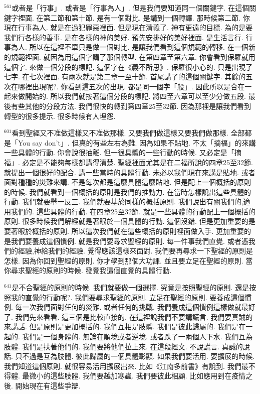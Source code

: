 \documentclass{book}
\begin{document}
$^{561}$或者是「行事」.
或者是「行事為人」.
但是我們要知道同一個關鍵字.
在這個關鍵字裡面.
在第二節和第十節.
是有一個對比.
是講到一個轉譯.
那時候第二節.
你現在行事為人.
就是在過犯罪惡裡面.
但是現在清義了.
神有更遠的目標.
為的是要我們行各樣的善事.
是在各樣的神的美好.
預先安排好的美好裡面.
是生活言行.
行事為人.
所以在這裡不單只是做一個對比.
是讓我們看到這個規範的轉移.
在一個新的規範裡面.
就因為用這個字講了那個轉型.
在第四章至第六章.
你會看到保羅就用這個字.
來做一個分段的標記.
這個字在《義不所思》.
保羅很小心的.
只是出現了七字.
在七次裡面.
有兩次就是第二章一至十節.
首尾講了的這個關鍵字.
其餘的五次在哪裡出現呢?.
你看到這五次的出現.
都是同一個字「般」.
因此所以是合在一起來做開始的.
所以我們就按著這個分段的標記.
將四至六章可以至少分做五段.
最後有些其他的分段方法.
我們很快的轉到第四章25至32節.
因為那裡是讓我們看到轉型的很多提示.
很多時候有人埋怨.

$^{601}$看到聖經又不准做這樣又不准做那樣.
又要我們做這樣又要我們做那樣.
全部都是「You say don't」.
但真的有些左右為難.
因為如果不貼地.
不太「摘福」的來講一些具體的行動.
你會說很抽離.
但一很具體的一些行動的時候.
又必定是「摘福」.
必定是不能夠每樣都講得清楚.
聖經裡面尤其是在二福所說的四章25至32節.
就提出一個很好的配合.
講一些當時的具體行動.
未必以我們現在來講是貼地.
或者面對種種的災難來講.
不是每次都是這麼具體這麼貼地.
但是配上一個概括的原則的時候.
我們就看到一個概括的原則是我們的推動力.
在當時怎樣說出這些具體的行動.
我們就要舉一反三.
我們就要基於同樣的概括原則.
我們說出有關我們的,適用我們的.
這些具體的行動.
在四章25至32節.
就是一些具體的行動配上一個概括的原則.
很多時候我們解經就是著眼於一個具體的行動.
這個沒錯.
但是更加重要的是要著眼於概括的原則.
所以這次我們就在這些概括的原則裡面做入手.
更加重要的是我們要養成這個慣例.
就是我們要尋求聖經的原則.
每一件事我們直覺.
或者憑我們的經驗,神給我們的經驗.
覺得應該這樣來面對.
我們要再尋求一下聖經的原則是怎樣.
因為你回到聖經的原則.
你才學到那個大功課.
並且要立足在聖經的原則.
當你尋求聖經的原則的時候.
發覺我這個直覺的具體行動.

$^{641}$是不合聖經的原則的時候.
我們就要做一個選擇.
究竟是按照聖經的原則.
還是按照我的直覺的行動呢?.
我們要尋求聖經的原則.
立足在聖經的原則.
要養成這個慣例.
每一次我們面對任何的災難.
或者任何的挑戰.
我們養成這個慣例這樣做就最好了.
我們先來看看.
這三個是比較直接的.
在這裡說我們不要講謊言.
我們要真誠的來講話.
但是原則是更加概括的.
我們互相是肢體.
我們是彼此歸屬的.
我們是在一起的.
我們是一個身體的.
無論在順境或者逆境.
或者跌了一兩個人下水.
我們互為肢體.
我們是扶著他們的.
我們要將他們拉上來.
在這段經文.
不說謊言.
真誠的說話.
只不過是互為肢體.
彼此歸屬的一個具體彰顯.
如果我們要活用.
要擴展的時候.
我們知道這個原則.
就很容易活用擴展出來.
比如《江南多前書》有說到.
我們最不得體.
最微小的這些肢體.
我們要越加寒蟲.
我們要彼此相顧.
比如應用到在疫情之後.
開始現在有這些爭辯.
\end{document}
